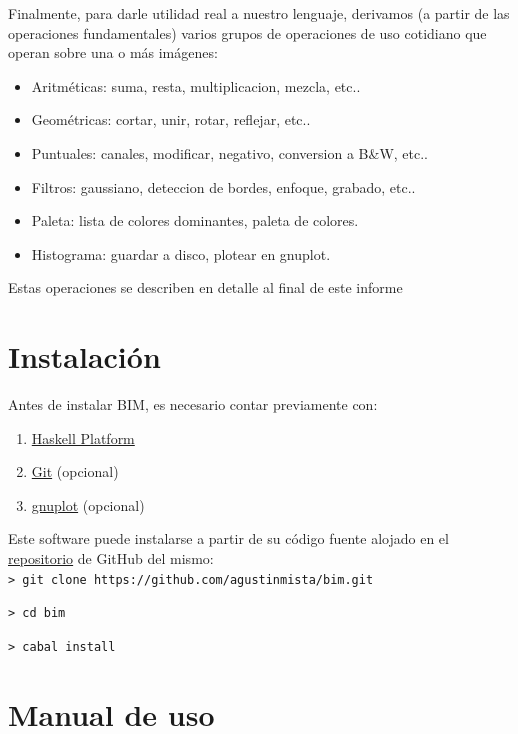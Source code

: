 \documentclass[a4paper, 11pt]{article} %
\begin{document}
\noindent Finalmente, para darle utilidad real a nuestro lenguaje, derivamos (a partir de las operaciones fundamentales) varios grupos de operaciones de uso cotidiano que operan sobre una o más imágenes:
	\begin{itemize}
		\item Aritméticas: suma, resta, multiplicacion, mezcla, etc..
		\item Geométricas: cortar, unir, rotar, reflejar, etc..
		\item Puntuales: canales, modificar, negativo, conversion a B\&W, etc..
		\item Filtros: gaussiano, deteccion de bordes, enfoque, grabado, etc..
		\item Paleta: lista de colores dominantes, paleta de colores.
		\item Histograma: guardar a disco, plotear en gnuplot.
	\end{itemize}
	
	Estas operaciones se describen en detalle al final de este informe


\section*{Instalación}

	Antes de instalar BIM, es necesario contar previamente con:

	\begin{enumerate}
		\item \href{https://www.haskell.org/platform}{Haskell Platform}
		\item \href{https://git-scm.com}{Git} (opcional)
		\item \href{http://www.gnuplot.info}{gnuplot} (opcional)
	\end{enumerate}


	\noindent Este software puede instalarse a partir de su código fuente alojado en el \href{https://github.com/agustinmista/bim}{repositorio} de GitHub del mismo:\\
	

	\texttt{> git clone https://github.com/agustinmista/bim.git}
	
	\texttt{> cd bim}
	
	\texttt{> cabal install}
	

\section*{Manual de uso}
\end{document}
